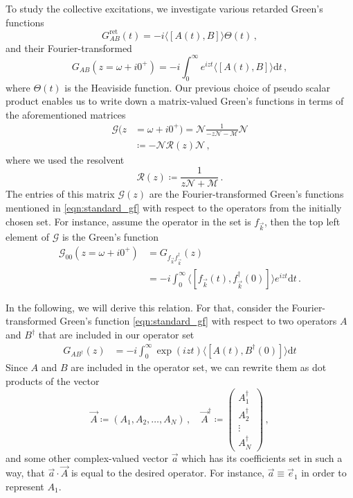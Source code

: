 \documentclass[
    reprint, 
    aps,
    preprintnumbers,
    twocolumn,
    prb,
    superscriptaddress
]{revtex4-2}
\newcommand{\vk}{\vec{k}}
\newcommand{\mM}{\mathcal{M}}
\newcommand{\mN}{\mathcal{N}}
\begin{document}
To study the collective excitations, we investigate various retarded Green's functions 
\begin{equation}
    G_{AB}^\text{ret} (t) = - i \langle [A(t), B] \rangle \Theta(t)\,,
\end{equation}
and their Fourier-transformed
\begin{equation}
    \label{eqn:standard_gf}
    G_{AB}(z = \omega + i0^+) = -i \int_0^{\infty} e^{izt} \langle [A(t), B] \rangle \mathrm{d}t\,,
\end{equation}
where $\Theta(t)$ is the Heaviside function.
Our previous choice of pseudo scalar product enables us to write down a matrix-valued Green's functions in terms of the aforementioned matrices
\begin{align}
    \label{eqn:green_function}
    \mathcal{G}(z &= \omega + i0^+) = \mN \frac{1}{-z \mN - \mM} \mN \\
        &\coloneqq  -\mN \mathcal{R}(z) \mN\,,
\end{align}
where we used the resolvent
\begin{equation}
    \label{eqn:resolvent}
    \mathcal{R}(z) \coloneqq  \frac{1}{z \mN + \mM}\,.
\end{equation}
The entries of this matrix $\mathcal{G}(z)$ are the Fourier-transformed Green's functions mentioned in \eqref{eqn:standard_gf} with respect to the operators from the initially chosen set.
For instance, assume the operator in the set is $f_{\vk}$, then the top left element of $\mathcal{G}$ is the Green's function 
\begin{align}
    \mathcal{G}_{00}(z = \omega +i0^+) &=  G_{f_{\vk} f_{\vk}^\dagger} (z) \nonumber \\
        &= -i \int_0^{\infty} \langle [f_{\vk}(t), f_{\vk}^\dagger(0)] \rangle e^{izt} \mathrm{d}t\,.
\end{align}

In the following, we will derive this relation.
For that, consider the Fourier-transformed Green's function \eqref{eqn:standard_gf} with respect to two operators $A$ and $B^\dagger$ that are included in our operator set
\begin{align}
    G_{AB^\dagger} (z) &= - i \int_0^\infty \exp(i z t) \langle [ A(t), B^\dagger(0) ] \rangle \mathrm{d}t
\end{align}
Since $A$ and $B$ are included in the operator set, we can rewrite them as dot products of the vector
\begin{equation}
    \vec{A} \coloneqq  \left( A_1, A_2, \dots, A_N \right)\,, \quad
    \vec{A}^\dagger \coloneqq  \begin{pmatrix}
        A_1^\dagger \\ A_2^\dagger \\ \vdots \\ A_N^\dagger
    \end{pmatrix}\,,
\end{equation}
and some other complex-valued vector $\vec{a}$ which has its coefficients set in such a way,
that $\vec{a} \cdot \vec{A}$ is equal to the desired operator. 
For instance, $\vec{a} \equiv \vec{e}_1$ in order to represent $A_1$.
\end{document}
